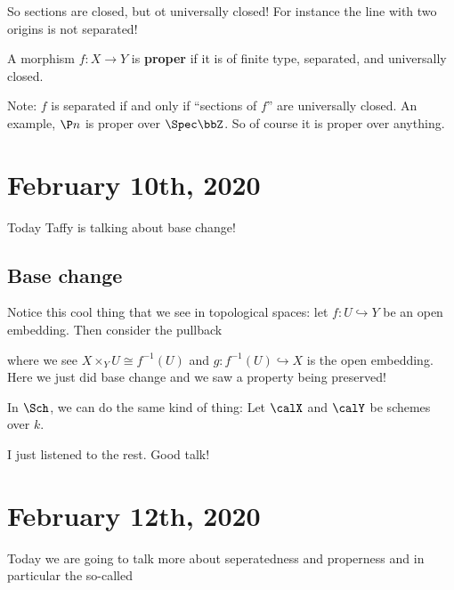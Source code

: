 \documentclass[12pt]{article}
\begin{document}
So sections are closed, but ot universally closed! For instance the line with two origins is not separated!

\begin{defn}
	A morphism $f:X\to Y$ is \textbf{proper} if it is of finite type, separated, and universally closed.
\end{defn}
Note: $f$ is separated if and only if ``sections of $f$'' are universally closed. An example, $\P n$ is proper over $\Spec\bbZ$.
So of course it is proper over anything.

\section{February 10th, 2020}
Today Taffy is talking about base change!

\subsection{Base change}
Notice this cool thing that we see in topological spaces: let $f:U\hookrightarrow Y$ be an open embedding. Then consider the pullback
\begin{figure}[h]
	\centering
\end{figure}
where we see $X\times_Y U\cong f^{-1}(U)$ and $g:f^{-1}(U)\hookrightarrow X$ is the open embedding. Here we just did base change and we saw a property being preserved!

In $\Sch$, we can do the same kind of thing: Let $\calX$ and $\calY$ be schemes over $k$. 

I just listened to the rest. Good talk!

\section{February 12th, 2020}
Today we are going to talk more about seperatedness and properness and in particular the so-called 
\end{document}
